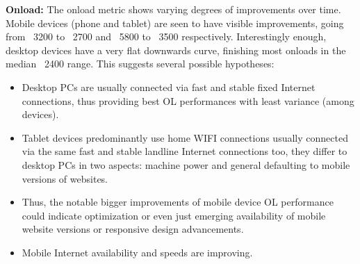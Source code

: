
\noindent\textbf{Onload:}
The onload metric %
shows varying degrees of improvements over time. Mobile devices (phone and tablet) are seen to have visible improvements, going from ~3200 to ~2700 and ~5800 to ~3500 respectively. %
Interestingly enough, desktop devices have a very flat downwards curve, %
finishing most onloads in the median ~2400 range.
This suggests several possible hypotheses:
\begin{itemize}[leftmargin=*]
\item Desktop PCs are usually connected via fast %
and stable fixed Internet connections, thus providing best OL performances with least variance (among devices). %
\item Tablet devices predominantly use home WIFI connections usually connected via the same fast and stable landline Internet connections too, they differ to desktop PCs in two aspects: machine power and general defaulting to mobile versions of websites.
\item Thus, the notable bigger improvements of mobile device OL performance could indicate optimization or even just emerging availability of mobile website versions \cite{cazanas2017strategies} or responsive design advancements. %
\item Mobile Internet availability and speeds are improving. %
\end{itemize}

